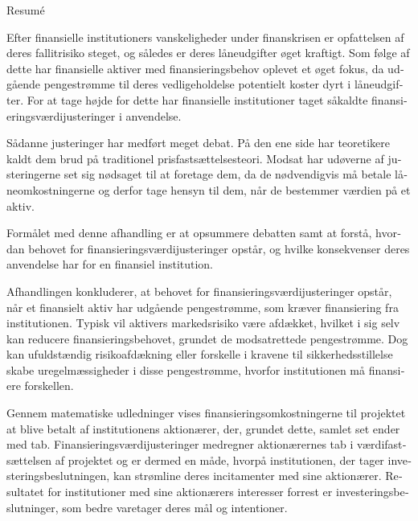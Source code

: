 \documentclass[main.tex]{subfiles}
\begin{document}
    \begin{otherlanguage}{danish}
    \thispagestyle{empty}
    \begin{center}
    {\LARGE Resumé}
    \end{center}

    Efter finansielle institutioners vanskeligheder under finanskrisen 
    er opfattelsen af deres fallitrisiko steget, og således er deres låneudgifter øget kraftigt.
    Som følge af dette har finansielle aktiver med finansieringsbehov oplevet et øget fokus, 
    da udgående pengestrømme til deres vedligeholdelse potentielt koster dyrt i låneudgifter.
    For at tage højde for dette
    har finansielle institutioner taget såkaldte finansieringsværdijusteringer i anvendelse.

    Sådanne justeringer har medført meget debat. 
    På den ene side har teoretikere kaldt dem brud på traditionel prisfastsættelsesteori.
    Modsat har udøverne af justeringerne set sig nødsaget til at foretage dem,
    da de nødvendigvis må betale låneomkostningerne 
    og derfor tage hensyn til dem, når de bestemmer værdien på et aktiv. 

    Formålet med denne afhandling er at opsummere debatten
    samt at forstå, hvordan behovet for finansieringsværdijusteringer opstår, 
    og hvilke konsekvenser deres anvendelse har for en finansiel institution. 

    Afhandlingen konkluderer, at behovet for finansieringsværdijusteringer opstår, 
    når et finansielt aktiv har udgående pengestrømme, som kræver finansiering fra institutionen.
    Typisk vil aktivers markedsrisiko være afdækket,
    hvilket i sig selv kan reducere finansieringsbehovet, grundet de modsatrettede pengestrømme.
    Dog kan ufuldstændig risikoafdækning eller forskelle i kravene til sikkerhedsstillelse
    skabe uregelmæssigheder i disse pengestrømme, hvorfor institutionen må finansiere forskellen.
    
    Gennem matematiske udledninger vises finansieringsomkostningerne til projektet
    at blive betalt af institutionens aktionærer,
    der, grundet dette, samlet set ender med tab.
    Finansieringsværdijusteringer medregner aktionærernes tab i værdifastsættelsen af projektet
    og er dermed en måde, hvorpå institutionen, der tager investeringsbeslutningen, 
    kan strømline deres incitamenter med sine aktionærer. 
    Resultatet for institutioner med sine aktionærers interesser forrest
    er investeringsbeslutninger, som bedre varetager deres mål og intentioner.
    
    \end{otherlanguage}
\end{document}

